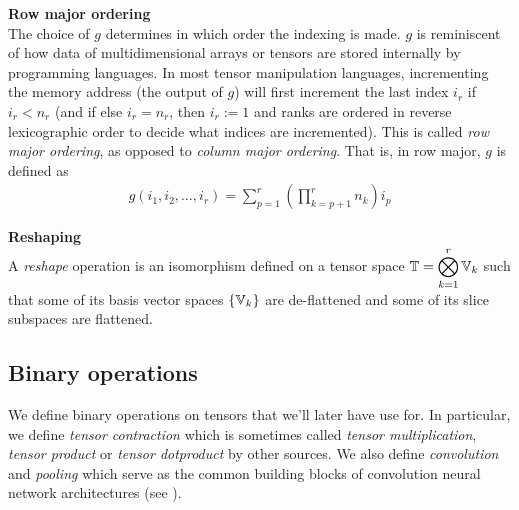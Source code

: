 \begin{remark}\textbf{Row major ordering}\\
The choice of $g$ determines in which order the indexing is made. $g$ is reminiscent of how data of multidimensional arrays or tensors are stored internally by programming languages. In most tensor manipulation languages, incrementing the memory address (\ie the output of $g$) will first increment the last index $i_r$ if $i_r < n_r$ (and if else $i_r = n_r$, then $i_r := 1$ and ranks are ordered in reverse lexicographic order to decide what indices are incremented). This is called \emph{row major ordering}, as opposed to \emph{column major ordering}. That is, in row major, $g$ is defined as
\begin{align}
  g(i_1, i_2, \ldots, i_r) = \displaystyle \sum_{p=1}^r \left( \prod_{k=p+1}^r n_k \right) i_p \label{eq:rowmajor}
\end{align}
\end{remark}

\begin{definition}\textbf{Reshaping}\\
A \emph{reshape} operation is an isomorphism defined on a tensor space $\mathbb{T} = \displaystyle \bigotimes_{k=1}^r \mathbb{V}_k$ such that some of its basis vector spaces $\{\mathbb{V}_k\}$ are de-flattened and some of its slice subspaces are flattened.
\end{definition}

\subsection{Binary operations}

We define binary operations on tensors that we'll later have use for. In particular, we define  \emph{tensor contraction} which is sometimes called \emph{tensor multiplication}, \emph{tensor product} or \emph{tensor dotproduct} by other sources. We also define \emph{convolution} and \emph{pooling} which serve as the common building blocks of convolution neural network architectures (see ).

